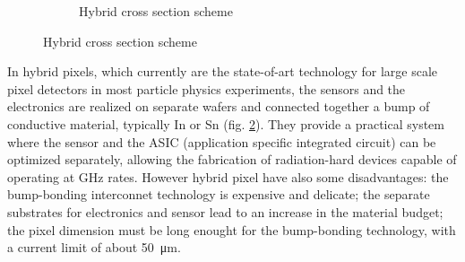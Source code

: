 \begin{figure}
\begin{subfigure}[b]{0.49\textwidth}
         \caption{Hybrid cross section scheme}
         \label{fig:hybrid_scheme}
      \end{subfigure}
   \end{figure}
   In hybrid pixels, which currently are the state-of-art technology for large scale pixel detectors in most particle physics experiments, the sensors and the electronics are realized on separate wafers and connected together a bump of conductive material, typically In or Sn  (fig. \ref{fig:hybrid_scheme}). 
   They provide a practical system where the sensor and the ASIC (application specific integrated circuit) can be optimized separately, allowing the fabrication of radiation-hard devices capable of operating at \si{GHz} rates.
   However hybrid pixel have also some disadvantages: the bump-bonding interconnet technology is expensive and delicate; the separate substrates for electronics and sensor lead to an increase in the material budget; the pixel dimension must be long enought for the bump-bonding technology, with a current limit of about \SI{50}{\um}.

